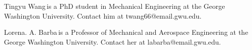 \documentclass{IEEEcsmag}
\begin{document}
\begin{IEEEbiography}{Tingyu Wang}{\,}is a PhD student in Mechanical Engineering at the George Washington University. Contact him at twang66@email.gwu.edu.
\end{IEEEbiography}

\begin{IEEEbiography}{Lorena. A. Barba}{\,}is a Professor of Mechanical and Aerospace Engineering at the George Washington University.  Contact her at labarba@email.gwu.edu.
\end{IEEEbiography}
\end{document}
